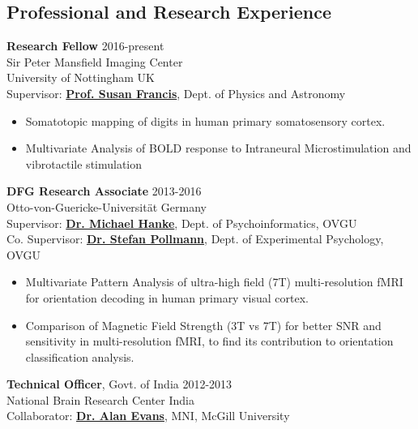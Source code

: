\documentclass[line, margin]{res}
\begin{document}
\begin{resume}
\section{Professional and Research Experience}

\textbf{Research Fellow} \hfill 2016-present\\
Sir Peter Mansfield Imaging Center\\
University of Nottingham \hfill UK\\
Supervisor: \href{https://www.nottingham.ac.uk/physics/people/susan.francis}{\textbf{Prof. Susan Francis}}, Dept. of Physics and Astronomy\\

\begin{itemize}
    \item Somatotopic mapping of digits in human primary somatosensory cortex. 
    \item Multivariate Analysis of BOLD response to Intraneural Microstimulation and vibrotactile stimulation
\end{itemize}

\textbf{DFG Research Associate} \hfill 2013-2016\\
Otto-von-Guericke-Universit\"{a}t \hfill Germany\\
Supervisor: \href{http://mih.voxindeserto.de/}{\textbf{Dr. Michael Hanke}}, Dept. of Psychoinformatics, OVGU\\
Co. Supervisor: \href{http://www.ipsy.ovgu.de/ipsy/en/Departments/Experimental+Psychology/People.html}{\textbf{Dr. Stefan Pollmann}}, Dept. of Experimental Psychology, OVGU

\begin{itemize}
    \item Multivariate Pattern Analysis of ultra-high field (7T) multi-resolution fMRI for orientation decoding in human primary visual cortex. 
    \item Comparison of Magnetic Field Strength (3T vs 7T) for better SNR and sensitivity in multi-resolution fMRI, to find its contribution to orientation classification analysis.
\end{itemize}


\textbf{Technical Officer}, Govt. of India \hfill 2012-2013\\
National Brain Research Center \hfill India\\
Collaborator: \href{http://mcin-cnim.ca/people/alans-cv/}{\textbf{Dr. Alan Evans}}, MNI, McGill University 
\begin{itemize}


\end{itemize}
\end{resume}
\end{document}
